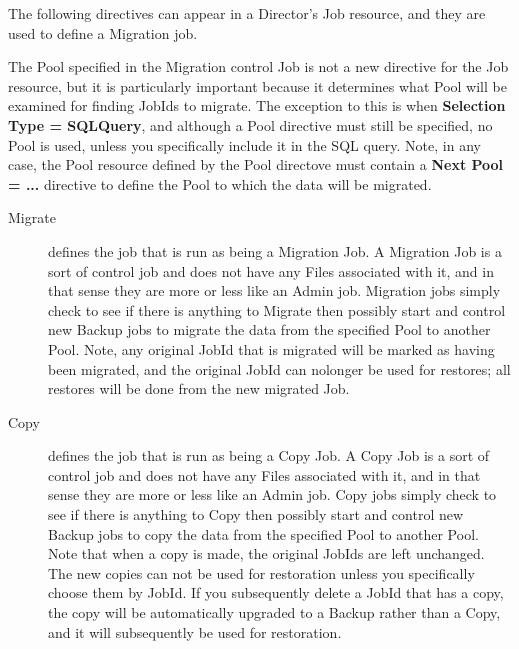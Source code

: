 The following directives can appear in a Director's Job resource, and they
are used to define a Migration job.

\begin{description}
   The Pool specified in the Migration
   control Job is not a new directive for the Job resource, but it is
   particularly important because it determines what Pool will be examined
   for finding JobIds to migrate.  The exception to this is when {\bf
   Selection Type = SQLQuery}, and although a Pool directive must still be
   specified, no Pool is used, unless you specifically include it in the
   SQL query.  Note, in any case, the Pool resource defined by the Pool
   directove must contain a {\bf Next Pool = ...} directive to define the
   Pool to which the data will be migrated.

\begin{description}
\item [Migrate]
   defines the job that is run as being a
   Migration Job.  A Migration Job is a sort of control job and does not have
   any Files associated with it, and in that sense they are more or less like
   an Admin job.  Migration jobs simply check to see if there is anything to
   Migrate then possibly start and control new Backup jobs to migrate the data
   from the specified Pool to another Pool.  Note, any original JobId that
   is migrated will be marked as having been migrated, and the original
   JobId can nolonger be used for restores; all restores will be done from
   the new migrated Job.

\item [Copy]
   defines the job that is run as being a
   Copy Job.  A Copy Job is a sort of control job and does not have
   any Files associated with it, and in that sense they are more or less like
   an Admin job.  Copy jobs simply check to see if there is anything to
   Copy then possibly start and control new Backup jobs to copy the data
   from the specified Pool to another Pool.  Note that when a copy is
   made, the original JobIds are left unchanged. The new copies can not
   be used for restoration unless you specifically choose them by JobId.
   If you subsequently delete a JobId that has a copy, the copy will be
   automatically upgraded to a Backup rather than a Copy, and it will
   subsequently be used for restoration.
\end{description}


\end{description}
